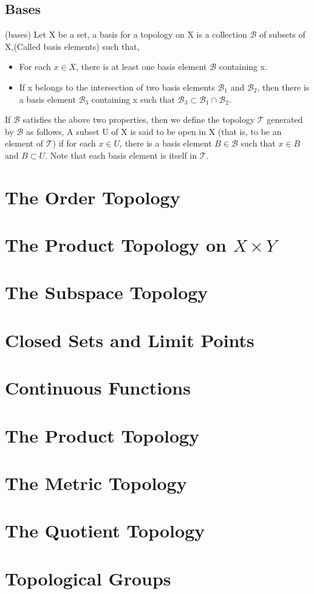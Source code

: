\documentclass{article}
\newcommand{\topo}{\mathcal T}
\begin{document}
\subsection{Bases}
\begin{myDef*}{(bases)}
    Let X be a set, a basis for a topology on X is a
	collection $\mathcal{B}$ of subsets of X,(Called 
	basis elements) such that,
	\begin{itemize}
		\item For each $x\in X$, there is at least one basis 
		      element $\mathcal{B}$ containing x.
		\item If x belongs to the intersection of two basis
		      elements $\mathcal{B}_1$ and $\mathcal{B}_2$, 
		      then there is a basis element $\mathcal{B}_3$
		      containing x such that $\mathcal{B}_3 \subset
		      \mathcal{B}_1 \cap \mathcal{B}_2$.
		      	 
	\end{itemize}
\end{myDef*}
\noindent If $\mathcal{B}$ satisfies the above two properties, then we 
define the topology $\topo$ generated by $\mathcal{B}$ as follows, A subset
U of X is said to be open in X (that is, to be an element of $\topo$) if
for each $x\in U$, there is a basis element $B\in \mathcal{B}$ such that
$x\in B$ and $B \subset U$. Note that each basis element is itself in
$\topo$.
\newpage

\section{The Order Topology}
\newpage

\section{The Product Topology on \texorpdfstring{$X\times Y$}{TEXT}}
\newpage

\section{The Subspace Topology}
\newpage

\section{Closed Sets and Limit Points}
\newpage

\section{Continuous Functions}
\newpage

\section{The Product Topology}
\newpage

\section{The Metric Topology}
\newpage

\section{The Quotient Topology}
\newpage

\section{Topological Groups} 
\end{document}
